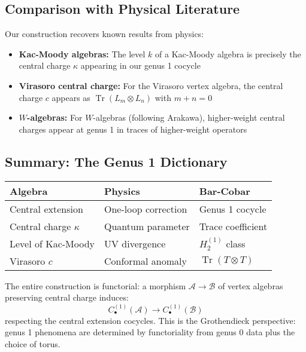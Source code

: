 \subsection{Comparison with Physical Literature}

Our construction recovers known results from physics:

\begin{itemize}
\item \textbf{Kac-Moody algebras:} The level $k$ of a Kac-Moody algebra is precisely
the central charge $\kappa$ appearing in our genus 1 cocycle

\item \textbf{Virasoro central charge:} For the Virasoro vertex algebra, the central
charge $c$ appears as $\operatorname{Tr}(L_m \otimes L_n)$ with $m+n = 0$

\item \textbf{$W$-algebras:} For $W$-algebras (following Arakawa), higher-weight
central charges appear at genus 1 in traces of higher-weight operators
\end{itemize}

\subsection{Summary: The Genus 1 Dictionary}

\begin{center}
\begin{tabular}{|l|l|l|}
\hline
\textbf{Algebra} & \textbf{Physics} & \textbf{Bar-Cobar} \\
\hline
Central extension & One-loop correction & Genus 1 cocycle \\
Central charge $\kappa$ & Quantum parameter & Trace coefficient \\
Level of Kac-Moody & UV divergence & $H_2^{(1)}$ class \\
Virasoro $c$ & Conformal anomaly & $\operatorname{Tr}(T \otimes T)$ \\
\hline
\end{tabular}
\end{center}

\begin{remark}[Functoriality]
The entire construction is functorial: a morphism $\mathcal{A} \to \mathcal{B}$
of vertex algebras preserving central charge induces:
$$C_{\bullet}^{(1)}(\mathcal{A}) \to C_{\bullet}^{(1)}(\mathcal{B})$$
respecting the central extension cocycles. This is the Grothendieck perspective:
genus 1 phenomena are determined by functoriality from genus 0 data plus the
choice of torus.
\end{remark}

